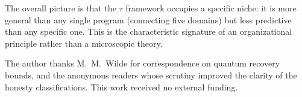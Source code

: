 \documentclass[prd,twocolumn,superscriptaddress,longbibliography,floatfix]{revtex4-2}
\newcommand{\tauasym}{\tau}
\begin{document}
The overall picture is that the $\tauasym$
framework occupies a specific niche: it is more
general than any single program (connecting five
domains) but less predictive than any specific one.
This is the characteristic signature of an
organizational principle rather than a microscopic
theory.


\begin{acknowledgments}
The author thanks M.~M.~Wilde for correspondence on
quantum recovery bounds, and the anonymous readers whose
scrutiny improved the clarity of the honesty
classifications.
This work received no external funding.
\end{acknowledgments}


\end{document}
